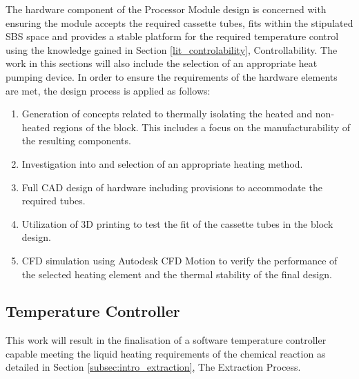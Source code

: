 The hardware component of the Processor Module design is concerned with ensuring the module accepts the required cassette tubes, fits within the stipulated SBS space and provides a stable platform for the required temperature control using the knowledge gained in Section \ref{lit_controlability}, Controllability. The work in this sections will also include the selection of an appropriate heat pumping device. In order to ensure the requirements of the hardware elements are met, the design process is applied as follows:
\begin{enumerate}
	\item Generation of concepts related to thermally isolating the heated and non-heated regions of the block. This includes a focus on the manufacturability of the resulting components.
	\item Investigation into and selection of an appropriate heating method.
	\item Full CAD design of hardware including provisions to accommodate the required tubes.
	\item Utilization of 3D printing to test the fit of the cassette tubes in the block design.
	\item CFD simulation using Autodesk CFD Motion to verify the performance of the selected heating element and the thermal stability of the final design. 
\end{enumerate} 

\subsection{Temperature Controller}

This work will result in the finalisation of a software temperature controller capable meeting the liquid heating requirements of the chemical reaction as detailed in Section \ref{subsec:intro_extraction}, The Extraction Process.

